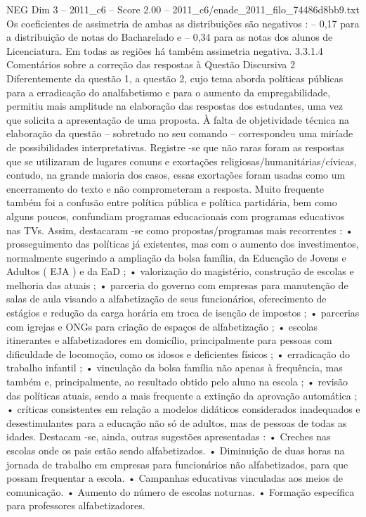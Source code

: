 \begin{textsample}{NEG Dim 3 – 2011\_c6 – Score 2.00 – 2011\_c6/enade\_2011\_filo\_74486d8bb9.txt}
Os coeficientes de assimetria de ambas as distribuições são negativos : – 0,17 para a distribuição de notas do Bacharelado e – 0,34 para as notas dos alunos de Licenciatura.
Em todas as regiões há também assimetria negativa. 3.3.1.4 Comentários sobre a correção das respostas à Questão Discursiva 2 Diferentemente da questão 1, a questão 2, cujo tema aborda políticas públicas para a erradicação do analfabetismo e para o aumento da empregabilidade, permitiu mais amplitude na elaboração das respostas dos estudantes, uma vez que solicita a apresentação de uma proposta.
À falta de objetividade técnica na elaboração da questão – sobretudo no seu comando – correspondeu uma miríade de possibilidades interpretativas.
Registre -se que não raras foram as respostas que se utilizaram de lugares comuns e exortações religiosas/humanitárias/cívicas, contudo, na grande maioria dos casos, essas exortações foram usadas como um encerramento do texto e não comprometeram a resposta.
Muito frequente também foi a confusão entre política pública e política partidária, bem como alguns poucos, confundiam programas educacionais com programas educativos nas TVs.
Assim, destacaram -se como propostas/programas mais recorrentes : • prosseguimento das políticas já existentes, mas com o aumento dos investimentos, normalmente sugerindo a ampliação da bolsa família, da Educação de Jovens e Adultos ( EJA ) e da EaD ; • valorização do magistério, construção de escolas e melhoria das atuais ; • parceria do governo com empresas para manutenção de salas de aula visando a alfabetização de seus funcionários, oferecimento de estágios e redução da carga horária em troca de isenção de impostos ; • parcerias com igrejas e ONGs para criação de espaços de alfabetização ; • escolas itinerantes e alfabetizadores em domicílio, principalmente para pessoas com dificuldade de locomoção, como os idosos e deficientes físicos ; • erradicação do trabalho infantil ; • vinculação da bolsa família não apenas à frequência, mas também e, principalmente, ao resultado obtido pelo aluno na escola ; • revisão das políticas atuais, sendo a mais frequente a extinção da aprovação automática ; • críticas consistentes em relação a modelos didáticos considerados inadequados e desestimulantes para a educação não só de adultos, mas de pessoas de todas as idades.
Destacam -se, ainda, outras sugestões apresentadas : • Creches nas escolas onde os pais estão sendo alfabetizados. • Diminuição de duas horas na jornada de trabalho em empresas para funcionários não alfabetizados, para que possam frequentar a escola. • Campanhas educativas vinculadas aos meios de comunicação. • Aumento do número de escolas noturnas. • Formação específica para professores alfabetizadores.

\end{textsample}
